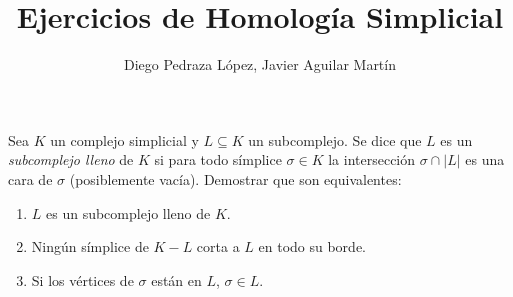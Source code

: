 \documentclass[twoside]{article}
\begin{document}
\title{Ejercicios de Homología Simplicial}
\author{Diego Pedraza López, Javier Aguilar Martín}
\maketitle

\begin{ejercicio}{1.1}
Sea $K$ un complejo simplicial y $L \subseteq K$ un subcomplejo.
Se dice que $L$ es un \emph{subcomplejo lleno} de $K$ si para todo símplice $σ \in K$ la intersección $σ \cap |L|$ es una cara de $σ$ (posiblemente vacía).
Demostrar que son equivalentes:
\begin{enumerate}
\item $L$ es un subcomplejo lleno de $K$.
\item Ningún símplice de $K-L$ corta a $L$ en todo su borde.
\item Si los vértices de $σ$ están en $L$, $σ \in L$.
\end{enumerate}
\end{ejercicio}
\end{document}
